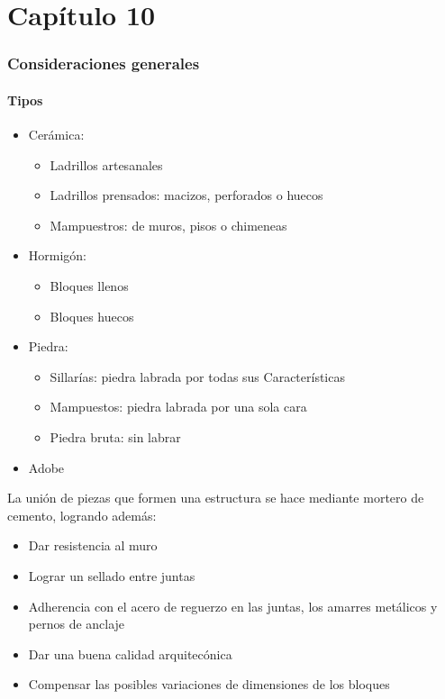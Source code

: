 \part{Capítulo 10}
\section{Consideraciones generales}
\subsection{Tipos}
\begin{itemize}
    \item Cerámica:
    \begin{itemize}
        \item Ladrillos artesanales
        \item Ladrillos prensados: macizos, perforados o huecos
        \item Mampuestros: de muros, pisos o chimeneas
    \end{itemize}
    \item Hormigón:
    \begin{itemize}
        \item Bloques llenos
        \item Bloques huecos
    \end{itemize}
    \item Piedra:
    \begin{itemize}
        \item Sillarías: piedra labrada por todas sus Características
        \item Mampuestos: piedra labrada por una sola cara
        \item Piedra bruta: sin labrar
    \end{itemize}
    \item Adobe
\end{itemize}

La unión de piezas que formen una estructura se hace mediante mortero de cemento, logrando además:
\begin{itemize}
    \item Dar resistencia al muro
    \item Lograr un sellado entre juntas
    \item Adherencia con el acero de reguerzo en las juntas, los amarres metálicos y pernos de anclaje
    \item Dar una buena calidad arquitecónica
    \item Compensar las posibles variaciones de dimensiones de los bloques
\end{itemize}

